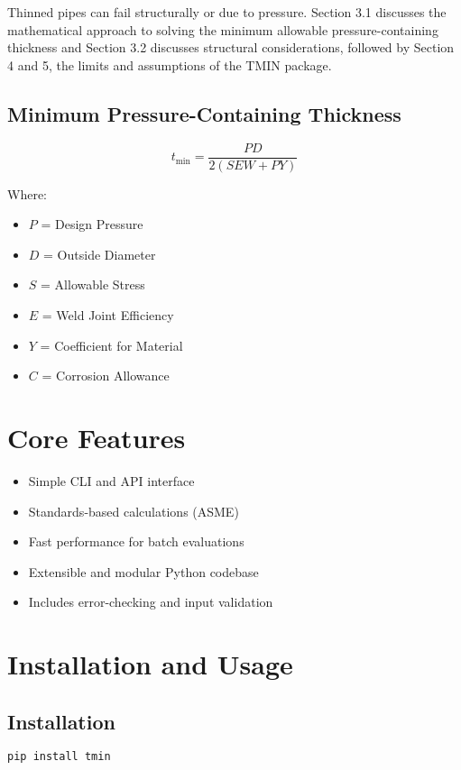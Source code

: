 \documentclass[11pt]{article}
\begin{document}
Thinned pipes can fail structurally or due to pressure. Section 3.1 discusses the mathematical approach to solving the minimum allowable pressure-containing thickness and Section 3.2 discusses structural considerations, followed by Section 4 and 5, the limits and assumptions of the TMIN package. 

\subsection{Minimum Pressure-Containing Thickness }
\begin{equation}
    t_{\text{min}} = \frac{P D}{2( S E W + P Y)} 
\end{equation}

Where:
\begin{itemize}
    \item $P$ = Design Pressure
    \item $D$ = Outside Diameter
    \item $S$ = Allowable Stress
    \item $E$ = Weld Joint Efficiency
    \item $Y$ = Coefficient for Material
    \item $C$ = Corrosion Allowance
\end{itemize}

\section{Core Features}
\begin{itemize}
    \item Simple CLI and API interface
    \item Standards-based calculations (ASME)
    \item Fast performance for batch evaluations
    \item Extensible and modular Python codebase
    \item Includes error-checking and input validation
\end{itemize}

\section{Installation and Usage}
\subsection*{Installation}
\begin{lstlisting}[language=bash]
pip install tmin
\end{lstlisting}
\end{document}
